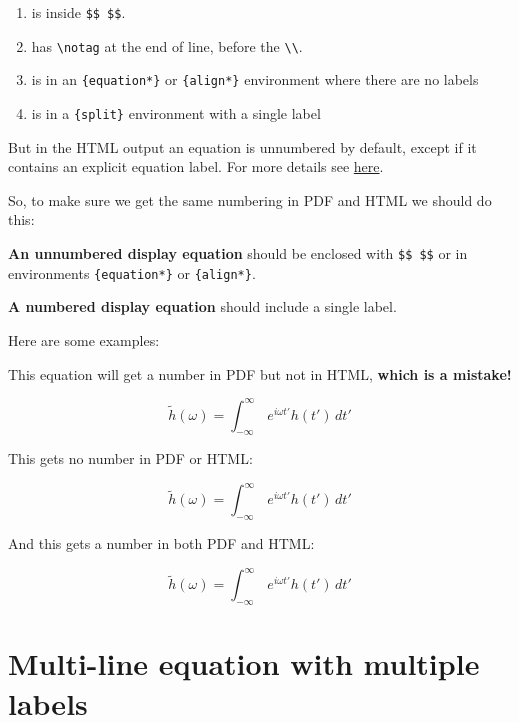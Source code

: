 \documentclass[]{book}
\providecommand{\tightlist}{%
  \setlength{\itemsep}{0pt}\setlength{\parskip}{0pt}}
\begin{document}
\begin{enumerate}
\def\labelenumi{\arabic{enumi}.}
\tightlist
\item
  is inside \texttt{\$\$\ \$\$}.
\item
  has \texttt{\textbackslash{}notag} at the end of line, before the \texttt{\textbackslash{}\textbackslash{}}.
\item
  is in an \texttt{\{equation*\}} or \texttt{\{align*\}} environment where there are no labels
\item
  is in a \texttt{\{split\}} environment with a single label
\end{enumerate}

But in the HTML output an equation is unnumbered by default, except if it contains an explicit equation label. For more details see \href{https://bookdown.org/yihui/bookdown/markdown-extensions-by-bookdown.html}{here}.

So, to make sure we get the same numbering in PDF and HTML we should do this:

\textbf{An unnumbered display equation} should be enclosed with \texttt{\$\$\ \$\$} or in environments \texttt{\{equation*\}} or \texttt{\{align*\}}.

\textbf{A numbered display equation} should include a single label.

Here are some examples:

This equation will get a number in PDF but not in HTML, \textbf{which is a mistake!}

\begin{equation} 
  \tilde h(\omega) = \int_{-\infty}^{\infty}\,e^{i\omega t'} h(t') \, dt'
\end{equation}

This gets no number in PDF or HTML:

\begin{equation*} 
  \tilde h(\omega) = \int_{-\infty}^{\infty}\,e^{i\omega t'} h(t') \, dt'
\end{equation*}

And this gets a number in both PDF and HTML:

\begin{equation} 
  \tilde h(\omega) = \int_{-\infty}^{\infty}\,e^{i\omega t'} h(t') \, dt'
  \label{eq:transfu}
\end{equation}

\hypertarget{multi-line-equation-with-multiple-labels}{%
\section{Multi-line equation with multiple labels}\label{multi-line-equation-with-multiple-labels}}
\end{document}
